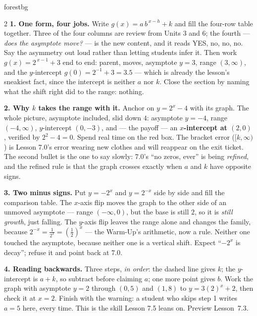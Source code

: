 \documentclass[10pt]{article}
\begin{document}
\begin{skillbox}[Lesson]{forestbg}
\begin{multicols}{2}
\textbf{1. One form, four jobs.} Write $g(x)=a\,b^{\,x-h}+k$ and fill the four-row table together.
Three of the four columns are review from Units 3 and 6; the fourth --- \emph{does the asymptote
move?} --- is the new content, and it reads YES, no, no, no. Say the asymmetry out loud rather than
letting students infer it. Then work $g(x)=2^{\,x-1}+3$ end to end: parent, moves, asymptote $y=3$,
range $(3,\infty)$, and the $y$-intercept $g(0)=2^{-1}+3=3.5$ --- which is already the lesson's
sneakiest fact, since the intercept is neither $a$ nor $k$. Close the section by naming what the
shift right did to the range: nothing.

\textbf{2. Why $k$ takes the range with it.} Anchor on $y=2^{x}-4$ with its graph. The whole picture,
asymptote included, slid down $4$: asymptote $y=-4$, range $(-4,\infty)$, $y$-intercept $(0,-3)$, and
--- the payoff --- an \textbf{$x$-intercept at $(2,0)$}, verified by $2^{2}-4=0$. Spend real time on
the red box. The bracket error ($[k,\infty)$) is Lesson 7.0's error wearing new clothes and will
reappear on the exit ticket. The second bullet is the one to say slowly: 7.0's ``no zeros, ever'' is
being \emph{refined}, and the refined rule is that the graph crosses exactly when $a$ and $k$ have
opposite signs.

\columnbreak

\textbf{3. Two minus signs.} Put $y=-2^{x}$ and $y=2^{-x}$ side by side and fill the comparison table.
The $x$-axis flip moves the graph to the other side of an unmoved asymptote --- range $(-\infty,0)$,
but the base is still $2$, so it is \emph{still growth}, just falling. The $y$-axis flip leaves the
range alone and changes the family, because $2^{-x}=\frac{1}{2^{x}}=\left(\frac12\right)^{x}$ --- the
Warm-Up's arithmetic, now a rule. Neither one touched the asymptote, because neither one is a vertical
shift. Expect ``$-2^{x}$ is decay''; refuse it and point back at 7.0.

\textbf{4. Reading backwards.} Three steps, \emph{in order}: the dashed line gives $k$; the
$y$-intercept is $a+k$, so subtract before claiming $a$; one more point gives $b$. Work the graph with
asymptote $y=2$ through $(0,5)$ and $(1,8)$ to $y=3(2)^{x}+2$, then check it at $x=2$. Finish with the
warning: a student who skips step 1 writes $a=5$ here, every time. This is the skill Lesson 7.5 leans
on. Preview Lesson~7.3.
\end{multicols}
\end{skillbox}
\end{document}
